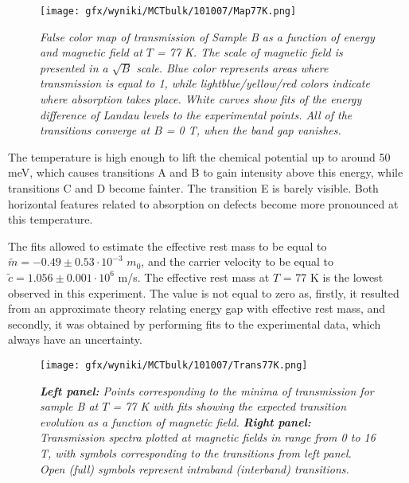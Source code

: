 \documentclass[titlepage,a4paper]{book}
\begin{document}
\begin{figure}[ht]
	\centering
	\texttt{[image: gfx/wyniki/MCTbulk/101007/Map77K.png]}
	\vspace{-10pt}
	\caption{\textit{False color map of transmission of Sample B as a function of energy and magnetic field at $T$ = 77 K. The scale of magnetic field is presented in a $\sqrt{B}$ scale. Blue color represents areas where transmission is equal to 1, while lightblue/yellow/red colors indicate where absorption takes place. White curves show fits of the energy difference of Landau levels to the experimental points. All of the transitions converge at $B$ = 0 T, when the band gap vanishes.}}
	\label{fig:Map_101007_77K}
\end{figure} 

The temperature is high enough to lift the chemical potential up to around 50 meV, which causes transitions A and B to gain intensity above this energy, while transitions C and D become fainter. The transition E is barely visible. Both horizontal features related to absorption on defects become more pronounced at this temperature.

The fits allowed to estimate the effective rest mass to be equal to $\tilde m = -0.49 \pm 0.53 \cdot 10^{-3}$ $m_0$, and the carrier velocity to be equal to $\tilde{c} = 1.056 \pm 0.001 \cdot 10^6$ m/s. The effective rest mass at $T$ = 77 K is the lowest observed in this experiment. The value is not equal to zero as, firstly, it resulted from an approximate theory relating energy gap with effective rest mass, and secondly, it was obtained by performing fits to the experimental data, which always have an uncertainty.  

\begin{figure}[ht]
	\centering
	\texttt{[image: gfx/wyniki/MCTbulk/101007/Trans77K.png]}
	\vspace{-10pt}
	\caption{\textit{\textbf{Left panel:} Points corresponding to the minima of transmission for sample B at $T$ = 77 K with fits showing the expected transition evolution as a function of magnetic field. \textbf{Right panel:} Transmission spectra plotted at magnetic fields in range from 0 to 16 T, with symbols corresponding to the transitions from left panel. Open (full) symbols represent intraband (interband) transitions.}}
	\label{fig:Spectra_101007_77K}
\end{figure}
\end{document}
